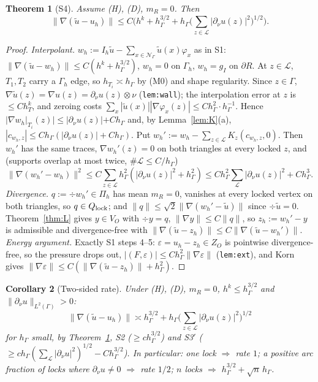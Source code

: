 \documentclass[11pt]{article}
\newtheorem{theorem}{Theorem}
\newtheorem{corollary}[theorem]{Corollary}
\theoremstyle{remark}
\newcommand{\hG}{h_\Gamma}
\newcommand{\VO}{V_O}
\newcommand{\Pih}{\Pi_h}
\newcommand{\Lk}{\mathcal L}
\newcommand{\dn}{\partial_\nu}
\newcommand{\norm}[1]{\|#1\|}
\newcommand{\Ql}{Q_{\rm lock}}
\begin{document}
\begin{theorem}[S4]\label{thm:S4}
Assume (H), (D), $m_R=0$. Then
\[\norm{\nabla(\tilde u-u_h)}\le C\Big(h^k+\hG^{3/2}+\hG\Big(\sum_{z\in\Lk}|\dn u(z)|^2\Big)^{1/2}\Big).\]
\end{theorem}
\begin{proof}
\emph{Interpolant.} $w_h:=I_h\tilde u-\sum_{x\in\mathcal N_\Gamma}\tilde u(x)\varphi_x$ as in S1:
$\norm{\nabla(\tilde u-w_h)}\le C(h^k+\hG^{3/2})$, $w_h=0$ on $\Gamma_h$, $w_h=g_I$ on $\partial R$. At $z\in\Lk$,
$T_1,T_2$ carry a $\Gamma_h$ edge, so $h_{T_i}\asymp\hG$ by (M0) and shape regularity. Since $z\in\Gamma$,
$\nabla\tilde u(z)=\nabla u(z)=\dn u(z)\otimes\nu$ (\texttt{lem:wall}); the interpolation error at $z$ is
$\le Ch_T^k$, and zeroing costs $\sum_x|\tilde u(x)||\nabla\varphi_x(z)|\le C\hG^2\cdot\hG^{-1}$. Hence
$|\nabla w_h|_{T_i}(z)|\le|\dn u(z)|+C\hG$ and, by Lemma~\ref{lem:K}(a), $|c_{w_h,z}|\le C\hG(|\dn u(z)|+C\hG)$.
Put $w_h':=w_h-\sum_{z\in\Lk}K_z(c_{w_h,z},0)$. Then $w_h'$ has the same traces, $\nabla w_h'(z)=0$ on both
triangles at every locked $z$, and (supports overlap at most twice, $\#\Lk\le C/\hG$)
\[\norm{\nabla(w_h'-w_h)}^2\le C\sum_{z\in\Lk}\hG^2(|\dn u(z)|^2+\hG^2)\le C\hG^2\sum_{\Lk}|\dn u(z)|^2+C\hG^3.\]
\emph{Divergence.} $q:=\div w_h'\in\Pih$ has mean $m_R=0$, vanishes at every locked vertex on both triangles,
so $q\in\Ql$; and $\norm q\le\sqrt2\norm{\nabla(w_h'-\tilde u)}$ since $\div\tilde u=0$.
Theorem~\ref{thm:L} gives $y\in\VO$ with $\div y=q$, $\norm{\nabla y}\le C\norm q$, so $z_h:=w_h'-y$ is
admissible and divergence-free with $\norm{\nabla(\tilde u-z_h)}\le C\norm{\nabla(\tilde u-w_h')}$.
\emph{Energy argument.} Exactly S1 steps 4--5: $\varepsilon=u_h-z_h\in Z_O$ is pointwise divergence-free, so the
pressure drops out, $|(F,\varepsilon)|\le C\hG^2\norm{\nabla\varepsilon}$ (\texttt{lem:ext}), and Korn gives
$\norm{\nabla\varepsilon}\le C(\norm{\nabla(\tilde u-z_h)}+\hG^2)$.
\end{proof}

\begin{corollary}[Two-sided rate]\label{cor:two}
Under (H), (D), $m_R=0$, $h^k\le\hG^{3/2}$ and $\norm{\dn u}_{L^2(\Gamma)}>0$:
\[\norm{\nabla(\tilde u-u_h)}\asymp\hG^{3/2}+\hG\Big(\sum_{z\in\Lk}|\dn u(z)|^2\Big)^{1/2}\]
for $\hG$ small, by Theorem~\ref{thm:S4}, S2 ($\ge c\hG^{3/2}$) and S3$'$ ($\ge c\hG(\sum_\Lk|\dn u|^2)^{1/2}-C\hG^{3/2}$).
In particular: one lock $\Rightarrow$ rate $1$; a positive arc fraction of locks where $\dn u\ne0$ $\Rightarrow$ rate $1/2$;
$n$ locks $\Rightarrow$ $\hG^{3/2}+\sqrt n\,\hG$.
\end{corollary}
\end{document}
